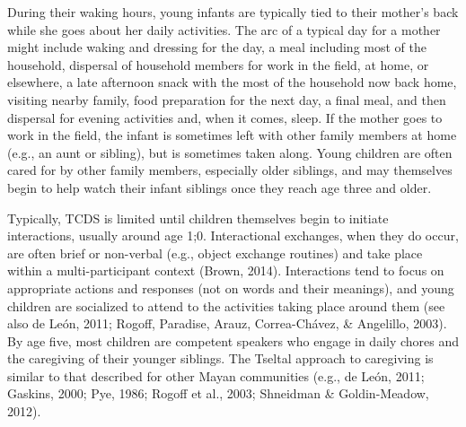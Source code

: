 \documentclass[floatsintext,man]{apa6}
\theoremstyle{definition}
\theoremstyle{definition}
\theoremstyle{definition}
\theoremstyle{remark}
\begin{document}
During their waking hours, young infants are typically tied to their
mother's back while she goes about her daily activities. The arc of a
typical day for a mother might include waking and dressing for the day,
a meal including most of the household, dispersal of household members
for work in the field, at home, or elsewhere, a late afternoon snack
with the most of the household now back home, visiting nearby family,
food preparation for the next day, a final meal, and then dispersal for
evening activities and, when it comes, sleep. If the mother goes to work
in the field, the infant is sometimes left with other family members at
home (e.g., an aunt or sibling), but is sometimes taken along. Young
children are often cared for by other family members, especially older
siblings, and may themselves begin to help watch their infant siblings
once they reach age three and older.

Typically, TCDS is limited until children themselves begin to initiate
interactions, usually around age 1;0. Interactional exchanges, when they
do occur, are often brief or non-verbal (e.g., object exchange routines)
and take place within a multi-participant context (Brown, 2014).
Interactions tend to focus on appropriate actions and responses (not on
words and their meanings), and young children are socialized to attend
to the activities taking place around them (see also de León, 2011;
Rogoff, Paradise, Arauz, Correa-Chávez, \& Angelillo, 2003). By age
five, most children are competent speakers who engage in daily chores
and the caregiving of their younger siblings. The Tseltal approach to
caregiving is similar to that described for other Mayan communities
(e.g., de León, 2011; Gaskins, 2000; Pye, 1986; Rogoff et al., 2003;
Shneidman \& Goldin-Meadow, 2012).
\end{document}
